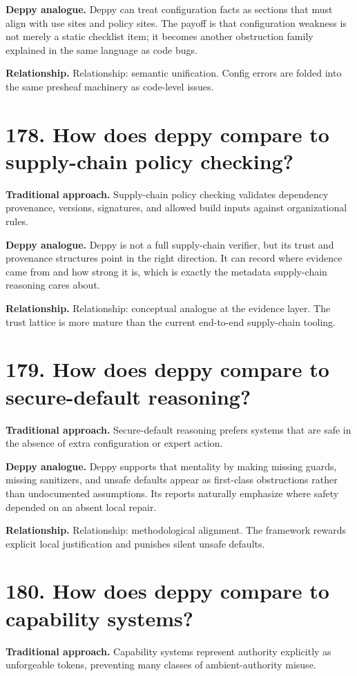 \documentclass[11pt,openany]{book}
\begin{document}
\textbf{Deppy analogue.} Deppy can treat configuration facts as sections that must align with use sites and policy sites. The payoff is that configuration weakness is not merely a static checklist item; it becomes another obstruction family explained in the same language as code bugs.

\textbf{Relationship.} Relationship: semantic unification. Config errors are folded into the same presheaf machinery as code-level issues.

\section*{178. How does deppy compare to supply-chain policy checking?}
\textbf{Traditional approach.} Supply-chain policy checking validates dependency provenance, versions, signatures, and allowed build inputs against organizational rules.

\textbf{Deppy analogue.} Deppy is not a full supply-chain verifier, but its trust and provenance structures point in the right direction. It can record where evidence came from and how strong it is, which is exactly the metadata supply-chain reasoning cares about.

\textbf{Relationship.} Relationship: conceptual analogue at the evidence layer. The trust lattice is more mature than the current end-to-end supply-chain tooling.

\section*{179. How does deppy compare to secure-default reasoning?}
\textbf{Traditional approach.} Secure-default reasoning prefers systems that are safe in the absence of extra configuration or expert action.

\textbf{Deppy analogue.} Deppy supports that mentality by making missing guards, missing sanitizers, and unsafe defaults appear as first-class obstructions rather than undocumented assumptions. Its reports naturally emphasize where safety depended on an absent local repair.

\textbf{Relationship.} Relationship: methodological alignment. The framework rewards explicit local justification and punishes silent unsafe defaults.

\section*{180. How does deppy compare to capability systems?}
\textbf{Traditional approach.} Capability systems represent authority explicitly as unforgeable tokens, preventing many classes of ambient-authority misuse.
\end{document}

